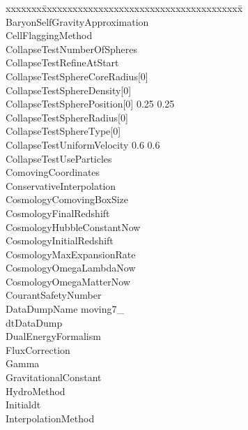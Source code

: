 \documentclass{book}
\begin{document}
{\parametersize
\begin{tabbing}
xxxxxxx\=xxxxxxxxxxxxxxxxxxxxxxxxxxxxxxxxxxxxxxx\=\kill
\> BaryonSelfGravityApproximation  \\
\> CellFlaggingMethod             \\
\> CollapseTestNumberOfSpheres  \\
\> CollapseTestRefineAtStart    \\
\> CollapseTestSphereCoreRadius[0]  \\
\> CollapseTestSphereDensity[0]     \\
\> CollapseTestSpherePosition[0]    0.25 0.25 \\
\> CollapseTestSphereRadius[0]      \\
\> CollapseTestSphereType[0]               \\
\> CollapseTestUniformVelocity      0.6 0.6 \\
\> CollapseTestUseParticles     \\
\> ComovingCoordinates                \\
\> ConservativeInterpolation    \\
\> CosmologyComovingBoxSize         \\
\> CosmologyFinalRedshift             \\
\> CosmologyHubbleConstantNow       \\
\> CosmologyInitialRedshift          \\
\> CosmologyMaxExpansionRate      \\
\> CosmologyOmegaLambdaNow     \\
\> CosmologyOmegaMatterNow     \\
\> CourantSafetyNumber          \\
\> DataDumpName           \> moving7\_ \\
\> dtDataDump              \\
\> DualEnergyFormalism                 \\
\> FluxCorrection               \\
\> Gamma                        \\
\> GravitationalConstant              \\
\> HydroMethod                  \\
\> Initialdt                    \\
\> InterpolationMethod                 \\

\end{tabbing}}
\end{document}
